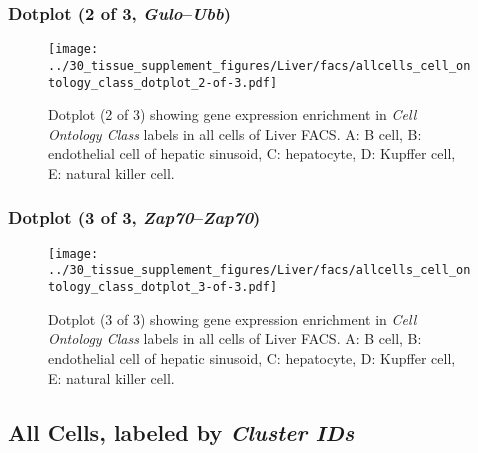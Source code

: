 \clearpage

\subsubsection{Dotplot (2 of 3, \emph{Gulo}--\emph{Ubb})}
\begin{figure}[h]
\centering
\texttt{[image: ../30\_tissue\_supplement\_figures/Liver/facs/allcells\_cell\_ontology\_class\_dotplot\_2-of-3.pdf]}

\caption{ Dotplot (2 of 3)  showing gene expression enrichment in \emph{Cell Ontology Class} labels in all cells of Liver FACS. A: B cell, B: endothelial cell of hepatic sinusoid, C: hepatocyte, D: Kupffer cell, E: natural killer cell.}
\end{figure}


\clearpage

\subsubsection{Dotplot (3 of 3, \emph{Zap70}--\emph{Zap70})}
\begin{figure}[h]
\centering
\texttt{[image: ../30\_tissue\_supplement\_figures/Liver/facs/allcells\_cell\_ontology\_class\_dotplot\_3-of-3.pdf]}

\caption{ Dotplot (3 of 3)  showing gene expression enrichment in \emph{Cell Ontology Class} labels in all cells of Liver FACS. A: B cell, B: endothelial cell of hepatic sinusoid, C: hepatocyte, D: Kupffer cell, E: natural killer cell.}
\end{figure}


\clearpage

\subsection{All Cells, labeled by \emph{Cluster IDs}}
